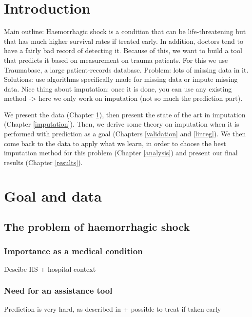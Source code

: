 \documentclass[12pt, a4paper]{memoir}
\begin{document}
\tableofcontents*
\vspace*{\fill}

\chapter*{Introduction}
Main outline: Haemorrhagic shock is a condition that can be life-threatening but that has much higher survival rates if treated early. In addition, doctors tend to have a fairly bad record of detecting it. Because of this, we want to build a tool that predicts it based on measurement on trauma patients. For this we use Traumabase, a large patient-records database. Problem: lots of missing data in it. Solutions: use algorithms specifically made for missing data or impute missing data. Nice thing about imputation: once it is done, you can use any existing method -> here we only work on imputation (not so much the prediction part).

We present the data (Chapter \ref{data}), then present the state of the art in imputation (Chapter \ref{imputation}). Then, we derive some theory on imputation when it is performed with prediction as a goal (Chapters \ref{validation} and \ref{linreg}). We then come back to the data to apply what we learn, in order to choose the best imputation method for this problem (Chapter \ref{analysis}) and present our final results (Chapter \ref{results}).

\chapter{Goal and data}
\label{data}
	\section{The problem of haemorrhagic shock}
	\label{shock}
		\subsection{Importance as a medical condition}
Descibe HS + hospital context
		\subsection{Need for an assistance tool}
Prediction is very hard, as described in \cite{doctors_prediction} + possible to treat if taken early
\end{document}
